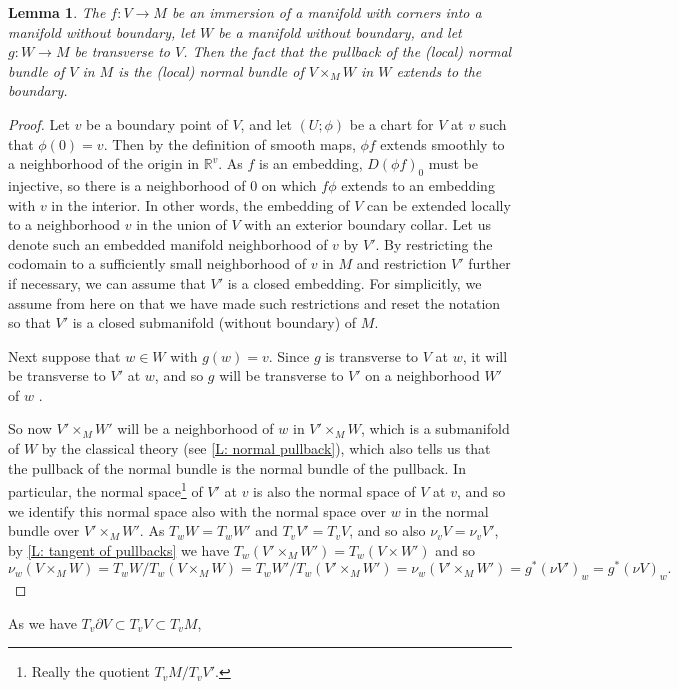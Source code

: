 \documentclass[12pt]{article}
\theoremstyle{plain}
\newtheorem{lemma}[theorem]{Lemma}
\theoremstyle{definition}
\theoremstyle{remark}
\newcommand{\R}{\mathbb{R}}
\newcommand{\bd}{\partial}
\begin{document}
\begin{lemma}
	The $f \colon V \to M$ be an immersion of a manifold with corners into a manifold without boundary, let $W$ be a manifold without boundary, and let $g \colon W \to M$ be transverse to $V$. 
	Then the fact that the pullback of the (local) normal bundle of $V$ in $M$ is the (local) normal bundle of $V \times_M W$ in $W$ extends to the boundary.
\end{lemma}
\begin{proof}
	Let $v$ be a boundary point of $V$, and let $(U;\phi)$ be a chart for $V$ at $v$ such that $\phi(0)=v$.
	Then by the definition of smooth maps, $\phi f$ extends smoothly to a neighborhood of the origin in $\R^v$.
	As $f$ is an embedding, $D(\phi f)_0$ must be injective, so there is a neighborhood of $0$ on which $f\phi$ extends to an embedding with $v$ in the interior. 
	In other words, the embedding of $V$ can be extended locally to a neighborhood $v$ in the union of $V$ with an exterior boundary collar. 
	Let us denote such an embedded manifold neighborhood of $v$ by $V'$. 
	By restricting the codomain to a sufficiently small neighborhood of $v$ in $M$ and restriction $V'$ further if necessary, we can assume that $V'$ is a closed embedding.
	For simplicitly, we assume from here on that we have made such restrictions and reset the notation so that $V'$ is a closed submanifold (without boundary) of $M$.  
	
	Next suppose that $w \in W$ with $g(w) = v$.
	Since $g$ is transverse to $V$ at $w$, it will be transverse to $V'$ at $w$, and so $g$ will be transverse to $V'$ on a neighborhood $W'$ of $w$ \cite[Proposition 7.1.18]{MaDo92}.

	So now $V' \times_M W'$ will be a neighborhood of $w$ in $V' \times_M W$, which is a submanifold of $W$ by the classical theory (see \cref{L: normal pullback}), which also tells us that the pullback of the normal bundle is the normal bundle of the pullback. 
	In particular, the normal space\footnote{Really the quotient $T_vM/T_vV'$.} of $V'$ at $v$ is also the normal space of $V$ at $v$, and so we identify this normal space also with the normal space over $w$ in the normal bundle over $V' \times_M W '$. 
	As $T_wW = T_w W'$ and $T_vV' = T_vV$, and so also $\nu_vV = \nu_v V'$, by \cref{L: tangent of pullbacks} we have $T_w(V' \times_M W')= T_w(V \times W')$ and so 
	$$\nu_w(V\times_M W) = T_wW/T_w(V \times_M W) = T_wW'/T_w(V' \times_M W') = \nu_w(V' \times_M W') = g^*(\nu V')_w = g^*(\nu V)_w.$$  
\end{proof}

As we have $T_v{\bd V} \subset T_v V  \subset T_vM$, 






\end{document}
